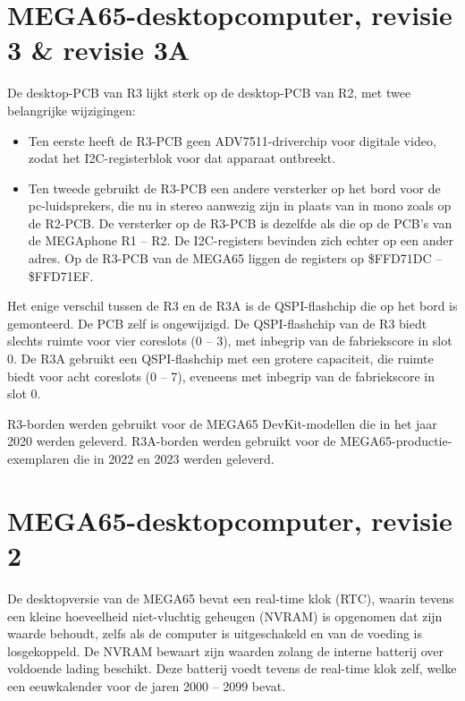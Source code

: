 \section{MEGA65-desktopcomputer, revisie 3 \& revisie 3A}

De desktop-PCB van R3 lijkt sterk op de desktop-PCB van R2, met twee belangrijke wijzigingen:

\begin{itemize}
\item Ten eerste heeft de R3-PCB geen ADV7511-driverchip voor digitale video, zodat het I2C-registerblok voor dat apparaat ontbreekt.\item Ten tweede gebruikt de R3-PCB een andere versterker op het bord voor de pc-luidsprekers, die nu in stereo aanwezig zijn in plaats van in mono zoals op de R2-PCB. De versterker op de R3-PCB is dezelfde als die op de PCB's van de MEGAphone R1 -- R2. De I2C-registers bevinden zich echter op een ander adres. Op de R3-PCB van de MEGA65 liggen de registers op \$FFD71DC -- \$FFD71EF.
\end{itemize}

Het enige verschil tussen de R3 en de R3A is de QSPI-flashchip die op het bord is gemonteerd. De PCB zelf is ongewijzigd. De QSPI-flashchip van de R3 biedt slechts ruimte voor vier coreslots (0 -- 3), met inbegrip van de fabriekscore in slot 0. De R3A gebruikt een QSPI-flashchip met een grotere capaciteit, die ruimte biedt voor acht coreslots (0 -- 7), eveneens met inbegrip van de fabriekscore in slot 0.

R3-borden werden gebruikt voor de MEGA65 DevKit-modellen die in het jaar 2020 werden geleverd. R3A-borden werden gebruikt voor de MEGA65-productie-exemplaren die in 2022 en 2023 werden geleverd.



\section{MEGA65-desktopcomputer, revisie 2}

De desktopversie van de MEGA65 bevat een real-time klok (RTC), waarin tevens een kleine hoeveelheid niet-vluchtig geheugen (NVRAM) is opgenomen dat zijn waarde behoudt, zelfs als de computer is uitgeschakeld en van de voeding is losgekoppeld. De NVRAM bewaart zijn waarden zolang de interne batterij over voldoende lading beschikt. Deze batterij voedt tevens de real-time klok zelf, welke een eeuwkalender voor de jaren 2000 -- 2099 bevat.


